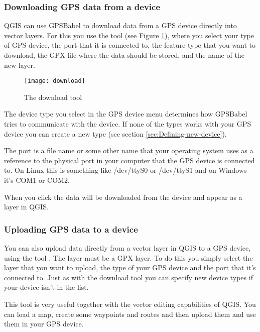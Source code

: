 \subsubsection{Downloading GPS data from a device}

QGIS can use GPSBabel to download data from a GPS device directly into vector layers.
For this you use the tool  (see Figure \ref{figure_download}), where you select your type
of GPS device, the port that it is connected to, the feature type that you want to download, the GPX file where the data should be stored, and the name of the new layer.

\begin{figure}[ht]
   \begin{center}
\caption{\label{figure_download}The download tool \nixcaption}
\texttt{[image: download]}
   \end{center}
\end{figure}


The device type you select in the GPS device menu determines how GPSBabel tries to communicate with the device.
If none of the types works with your GPS device you can create a new type (see section \ref{sec:Defining-new-device}).

The port is a file name or some other name that your operating system uses as a reference to the physical port in your computer that the GPS device is connected to.
\nix On Linux this is something like /dev/ttyS0 or /dev/ttyS1 and on \win Windows it's COM1 or COM2.

When you click  the data will be downloaded from the device and appear as a layer in QGIS.

\subsubsection{Uploading GPS data to a device}

You can also upload data directly from a vector layer in QGIS to a GPS device, using the tool .
The layer must be a GPX layer.
To do this you simply select the layer that you want to upload, the type of your GPS device and the port that it's connected to.
Just as with the download tool you can specify new device types if your device isn't in the list.

This tool is very useful together with the vector editing capabilities of QGIS.
You can load a map, create some waypoints and routes and then upload them and use them in your GPS device.

